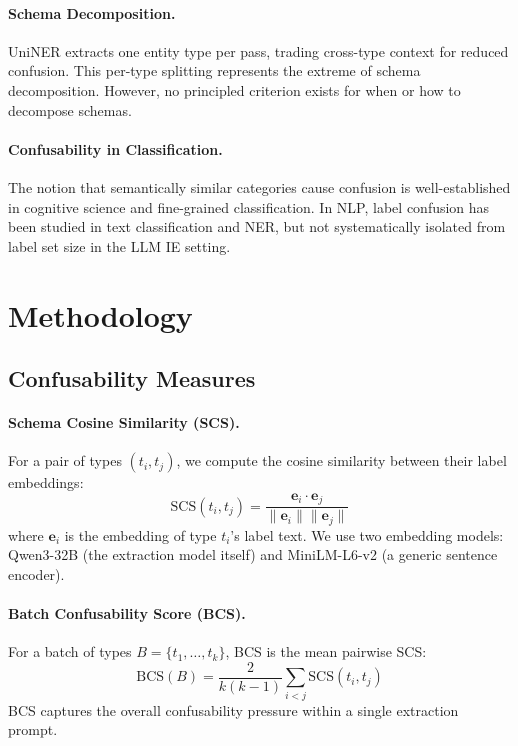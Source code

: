 \documentclass[11pt,a4paper]{article}
\begin{document}
\paragraph{Schema Decomposition.}
UniNER \cite{zhou2024universalner} extracts one entity type per pass, trading cross-type context for reduced confusion.
This per-type splitting represents the extreme of schema decomposition.
However, no principled criterion exists for when or how to decompose schemas.

\paragraph{Confusability in Classification.}
The notion that semantically similar categories cause confusion is well-established in cognitive science and fine-grained classification.
In NLP, label confusion has been studied in text classification and NER, but not systematically isolated from label set size in the LLM IE setting.

\section{Methodology}

\subsection{Confusability Measures}

\paragraph{Schema Cosine Similarity (SCS).}
For a pair of types $(t_i, t_j)$, we compute the cosine similarity between their label embeddings:
\begin{equation}
\text{SCS}(t_i, t_j) = \frac{\mathbf{e}_i \cdot \mathbf{e}_j}{\|\mathbf{e}_i\| \|\mathbf{e}_j\|}
\end{equation}
where $\mathbf{e}_i$ is the embedding of type $t_i$'s label text.
We use two embedding models: Qwen3-32B (the extraction model itself) and MiniLM-L6-v2 (a generic sentence encoder).

\paragraph{Batch Confusability Score (BCS).}
For a batch of types $B = \{t_1, \ldots, t_k\}$, BCS is the mean pairwise SCS:
\begin{equation}
\text{BCS}(B) = \frac{2}{k(k-1)} \sum_{i<j} \text{SCS}(t_i, t_j)
\end{equation}
BCS captures the overall confusability pressure within a single extraction prompt.
\end{document}
